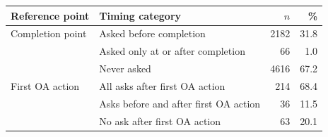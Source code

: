 \begin{tabular}{ll rr}
\toprule
Reference point & Timing category & $n$ & \% \\
\midrule
Completion point & Asked before completion & 2182 & 31.8 \\
 & Asked only at or after completion & 66 & 1.0 \\
 & Never asked & 4616 & 67.2 \\
\midrule
First OA action & All asks after first OA action & 214 & 68.4 \\
 & Asks before and after first OA action & 36 & 11.5 \\
 & No ask after first OA action & 63 & 20.1 \\
\bottomrule
\end{tabular}